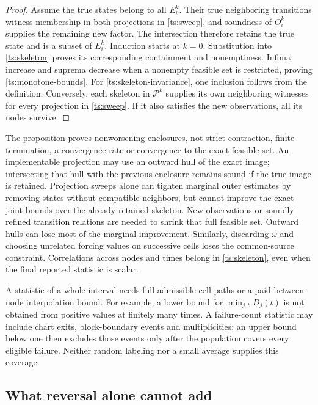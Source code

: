 \begin{proof}
Assume the true states belong to all $E_i^k$. Their true neighboring
transitions witness membership in both projections in
\eqref{ts:sweep}, and soundness of $O_i^k$ supplies the remaining new
factor. The intersection therefore retains the true state and is a
subset of $E_i^k$. Induction starts at $k=0$. Substitution into
\eqref{ts:skeleton} proves its corresponding containment and
nonemptiness. Infima increase and suprema decrease when a nonempty
feasible set is restricted, proving \eqref{ts:monotone-bounds}.
For \eqref{ts:skeleton-invariance}, one inclusion follows from the
definition. Conversely, each skeleton in $\mathcal P^k$ supplies its
own neighboring witnesses for every projection in \eqref{ts:sweep}.
If it also satisfies the new observations, all its nodes survive.
\end{proof}

The proposition proves nonworsening enclosures, not strict contraction,
finite termination, a convergence rate or convergence to the exact
feasible set. An implementable projection may use an outward hull of
the exact image; intersecting that hull with the previous enclosure
remains sound if the true image is retained. Projection sweeps alone can
tighten marginal outer estimates by removing states without compatible
neighbors, but cannot improve the exact joint bounds over the already
retained skeleton. New observations or soundly refined transition
relations are needed to shrink that full feasible set. Outward hulls can
lose most of the marginal improvement. Similarly, discarding $\omega$ and choosing
unrelated forcing values on successive cells loses the common-source
constraint. Correlations across nodes and times belong in
\eqref{ts:skeleton}, even when the final reported statistic is scalar.

A statistic of a whole interval needs full admissible cell paths or a
paid between-node interpolation bound. For example, a lower bound for
$\min_{j,t}D_j(t)$ is not obtained from positive values at finitely many
times. A failure-count statistic may include chart exits, block-boundary
events and multiplicities; an upper bound below one then excludes those
events only after the population covers every eligible failure. Neither
random labeling nor a small average supplies this coverage.

\subsection{What reversal alone cannot add}

